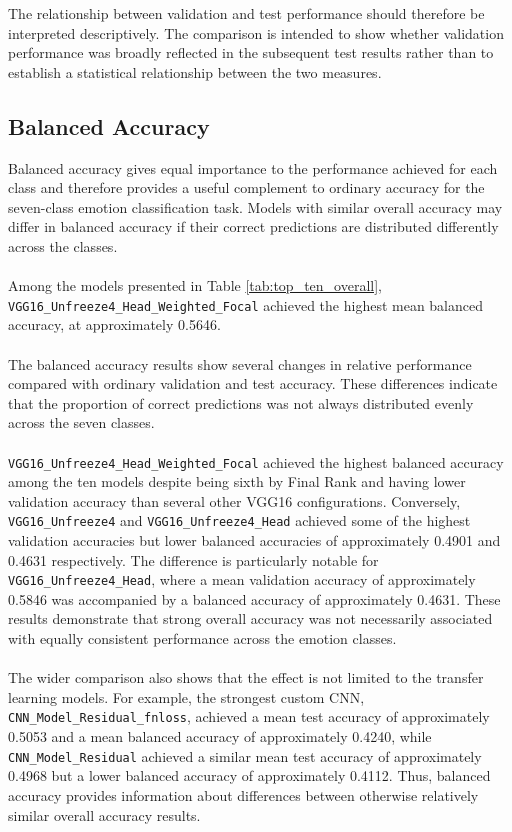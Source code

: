 \documentclass[12pt, a4paper]{report}
\let\oldsubsection\subsection
\renewcommand{\subsection}{%
    \Needspace{6\baselineskip}%
    \oldsubsection
}
\begin{document}
				The relationship between validation and test performance should therefore be interpreted descriptively. The comparison is intended to show whether validation performance was broadly reflected in the subsequent test results rather than to establish a statistical relationship between the two measures.
				
			\subsection{Balanced Accuracy}
				
				Balanced accuracy gives equal importance to the performance achieved for each class and therefore provides a useful complement to ordinary accuracy for the seven-class emotion classification task. Models with similar overall accuracy may differ in balanced accuracy if their correct predictions are distributed differently across the classes.\\\\
				Among the models presented in Table \ref{tab:top_ten_overall}, \\\texttt{VGG16\_Unfreeze4\_Head\_Weighted\_Focal} achieved the highest mean balanced accuracy, at approximately 0.5646.\\\\
				The balanced accuracy results show several changes in relative performance compared with ordinary validation and test accuracy. These differences indicate that the proportion of correct predictions was not always distributed evenly across the seven classes.\\\\
				\texttt{VGG16\_Unfreeze4\_Head\_Weighted\_Focal} achieved the highest balanced accuracy among the ten models despite being sixth by Final Rank and having lower validation accuracy than several other VGG16 configurations. Conversely, \\\texttt{VGG16\_Unfreeze4} and \texttt{VGG16\_Unfreeze4\_Head} achieved some of the highest validation accuracies but lower balanced accuracies of approximately 0.4901 and 0.4631 respectively. The difference is particularly notable for \texttt{VGG16\_Unfreeze4\_Head}, where a mean validation accuracy of approximately 0.5846 was accompanied by a balanced accuracy of approximately 0.4631. These results demonstrate that strong overall accuracy was not necessarily associated with equally consistent performance across the emotion classes.\\\\
				The wider comparison also shows that the effect is not limited to the transfer learning models. For example, the strongest custom CNN, \texttt{CNN\_Model\_Residual\_fnloss}, achieved a mean test accuracy of approximately 0.5053 and a mean balanced accuracy of approximately 0.4240, while \texttt{CNN\_Model\_Residual} achieved a similar mean test accuracy of approximately 0.4968 but a lower balanced accuracy of approximately 0.4112. Thus, balanced accuracy provides information about differences between otherwise relatively similar overall accuracy results.
				
\end{document}
